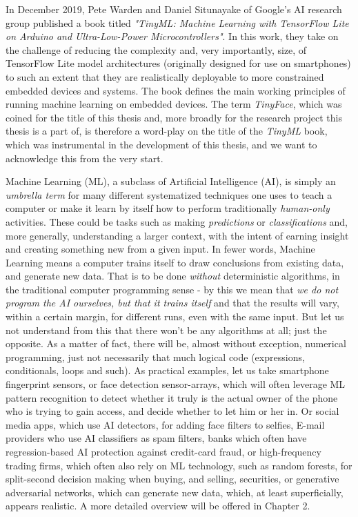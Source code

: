 In December 2019, Pete Warden and Daniel Situnayake of Google's AI research group published a book titled \textit{"TinyML: Machine Learning with TensorFlow Lite on Arduino and Ultra-Low-Power Microcontrollers"}. In this work, they take on the challenge of reducing the complexity and, very importantly, size, of TensorFlow Lite model architectures (originally designed for use on smartphones) to such an extent that they are realistically deployable to more constrained embedded devices and systems. The book defines the main working principles of running machine learning on embedded devices. \cite{tinyml_book} The term \textit{TinyFace}, which was coined for the title of this thesis and, more broadly for the research project this thesis is a part of, is therefore a word-play on the title of the \textit{TinyML} book, which was instrumental in the development of this thesis, and we want to acknowledge this from the very start. \par
Machine Learning (ML), a subclass of Artificial Intelligence (AI), is simply an \textit{umbrella term} for many different systematized techniques one uses to teach a computer or make it learn by itself how to perform traditionally \textit{human-only} activities. These could be tasks such as making \textit{predictions} or \textit{classifications} and, more generally, understanding a larger context, with the intent of earning insight and creating something new from a given input. In fewer words, Machine Learning means a computer trains itself to draw conclusions from existing data, and generate new data. That is to be done \textit{without} deterministic algorithms, in the traditional computer programming sense - by this we mean that \textit{we do not program the AI ourselves, but that it trains itself} and that the results will vary, within a certain margin, for different runs, even with the same input. \cite{Goodfellow-et-al-2016} But let us not understand from this that there won't be any algorithms at all; just the opposite. As a matter of fact, there will be, almost without exception, numerical programming, just not necessarily that much logical code (expressions, conditionals, loops and such). As practical examples, let us take smartphone fingerprint sensors, or face detection sensor-arrays, which will often leverage ML pattern recognition to detect whether it truly is the actual owner of the phone who is trying to gain access, and decide whether to let him or her in. Or social media apps, which use AI detectors, for adding face filters to selfies, E-mail providers who use AI classifiers as spam filters, banks which often have regression-based AI protection against credit-card fraud, or high-frequency trading firms, which often also rely on ML technology, such as random forests, for split-second decision making when buying, and selling, securities, or generative adversarial networks, which can generate new data, which, at least superficially, appears realistic. \cite{gans_goodfellow} A more detailed overview will be offered in Chapter 2. \par
